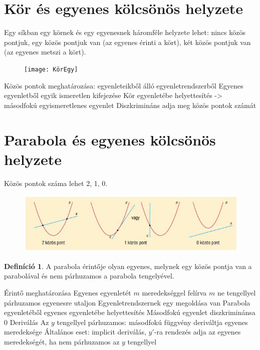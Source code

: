 \documentclass[twoside,12pt]{report}
\theoremstyle{definition}
\newtheorem{definition}[theorem]{Definíció}
\begin{document}
\section{Kör és egyenes kölcsönös helyzete}
	Egy síkban egy körnek és egy egyenesnek háromféle helyzete lehet: nincs közös pontjuk, egy közös pontjuk van (az egyenes érinti a kört), két közös pontjuk van (az egyenes metszi a kört).
	\begin{figure}[H]
		\centering
		\texttt{[image: KörEgy]}
	\end{figure}
	\begin{outline}
		\1 Közös pontok meghatározása: egyenleteikből álló egyenletrendszerből
			\2 Egyenes egyenletből egyik ismeretlen kifejezése
			\2 Kör egyenletébe helyettesítés -> másodfokú egyismeretlenes egyenlet
			\2 Diszkrimináns adja meg közös pontok számát
	\end{outline}
\section{Parabola és egyenes kölcsönös helyzete}
	Közös pontok száma lehet 2, 1, 0.
	\begin{figure}[H]
		\centering
		\includegraphics[width=\linewidth]{ParEgye}
	\end{figure}
	\begin{definition}
		A parabola érintője olyan egyenes, melynek egy közös pontja van a parabolával és
		nem párhuzamos a parabola tengelyével.
	\end{definition}
	\begin{outline}
		\1 Érintő meghatározása
			\2 Egyenes egyenletét $m$ meredekséggel felírva
				\3 $m$ ne tengellyel párhuzamos egyenesre utaljon
			\2 Egyenletrendszernek egy megoldása van
			\2 Parabola egyenletéből egyenes egyenletébe helyettesítés
				\3 Másodfokú egyenlet diszkriminánsa 0
		\1 Deriválás
			\2 Az $y$ tengellyel párhuzamos: másodfokú függvény deriváltja egyenes meredeksége
			\2 Általános eset: implicit deriválás, $y'$-ra rendezés adja az egyenes meredekségét, ha nem párhuzamos az $y$ tengellyel
	\end{outline}
\end{document}
